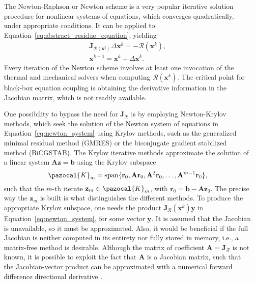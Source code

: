           The Newton-Raphson or Newton scheme is a very popular iterative solution procedure for nonlinear systems of equations, which converges quadratically, under appropriate conditions.
          It can be applied to Equation~\eqref{eq:abstract_residue_equation}, yielding
          \begin{gather}
            \bm{\mathbf{J}}_{\bm{\mathcal{R}}(\mathbf{x}^k)}\Delta \mathbf{x}^k = - \bm{\mathcal{R}}(\mathbf{x}^k), \label{eq:newton_system}\\
            \mathbf{x}^{k+1} = \mathbf{x}^k + \Delta \mathbf{x}^k. \label{eq:newton_iter}
          \end{gather}
          Every iteration of the Newton scheme involves at least one invocation of the thermal and mechanical solvers when computing $\bm{\mathcal{R}}\left(\mathbf{x}^{k}\right)$.
          The critical point for black-box equation coupling is obtaining the derivative information in the Jacobian matrix, which is not readily available.

          One possibility to bypass the need for $\bm{\mathbf{J}}_{\bm{\mathcal{R}}}$ is by employing Newton-Krylov methods, which seek the solution of the Newton system of equations in Equation~\eqref{eq:newton_system} using Krylov methods, such as the generalized minimal residual method (GMRES) or the biconjugate gradient stabilized method (BiCGSTAB).
          The Krylov iterative methods approximate the solution of a linear system \(\mathbf{A} \mathbf{z} = \mathbf{b}\) using the Krylov subspace
          \begin{equation}
            \pazocal{K}_m = \operatorname{span}\{\mathbf{r}_0, \mathbf{A}\mathbf{r}_0, \mathbf{A}^2 \mathbf{r}_0, \dots, \mathbf{A}^{m-1}\mathbf{r}_0\},
          \end{equation}
          such that the \(m\)-th iterate  \(\mathbf{z}_m\in \pazocal{K}_m\), with \(\mathbf{r}_0 = \mathbf{b} - \mathbf{A} \mathbf{z}_0\).
          The precise way the \(\mathbf{z}_m\) is built is what distinguishes the different methods.
          To produce the appropriate Krylov subspace, one needs the product \(\bm{\mathbf{J}}_{\bm{\mathcal{R}}}(\mathbf{x}^k) \mathbf{y}\) in Equation~\eqref{eq:newton_system}, for some vector \(\mathbf{y}\).
          It is assumed that the Jacobian is unavailable, so it must be approximated.
          Also, it would be beneficial if the full Jacobian is neither computed in its entirety nor fully stored in memory, i.e., a matrix-free method is desirable.
          Although the matrix of coefficient $\mathbf{A}=\bm{\mathbf{J}}_{\bm{\mathcal{R}}}$ is not known, it is possible to exploit the fact that $\mathbf{A}$ is a Jacobian matrix, such that the Jacobian-vector product can be approximated with a numerical forward difference directional derivative \citep{kelley_solving_2003}.

